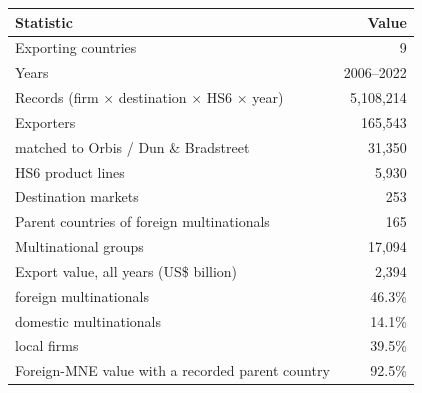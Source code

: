 \begin{tabular}{lr}
\toprule
Statistic & Value \\
\midrule
Exporting countries & 9 \\
Years & 2006--2022 \\
Records (firm $\times$ destination $\times$ HS6 $\times$ year) & 5,108,214 \\
Exporters & 165,543 \\
\quad matched to Orbis / Dun \& Bradstreet & 31,350 \\
HS6 product lines & 5,930 \\
Destination markets & 253 \\
Parent countries of foreign multinationals & 165 \\
Multinational groups & 17,094 \\
\midrule
Export value, all years (US\$ billion) & 2,394 \\
\quad foreign multinationals & 46.3\% \\
\quad domestic multinationals & 14.1\% \\
\quad local firms & 39.5\% \\
Foreign-MNE value with a recorded parent country & 92.5\% \\
\bottomrule
\end{tabular}
